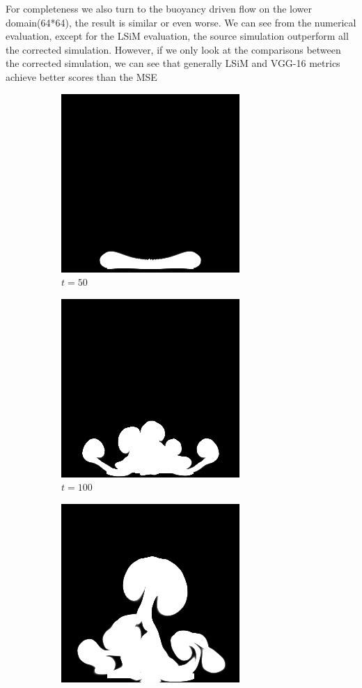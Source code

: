 \documentclass[a4paper,12pt,twoside]{report}
\begin{document}
For completeness we also turn to the buoyancy driven flow on the lower domain(64*64), the result is similar or even worse. We can see from the numerical evaluation, except for the LSiM evaluation, the source simulation outperform all the corrected simulation. However, if we only look at the comparisons between the corrected simulation, we can see that generally LSiM and VGG-16 metrics achieve better scores than the MSE
\begin{figure}
\centering
\begin{subfigure}{0.18\textwidth}
  \centering
  \includegraphics[scale=0.28]{buoyancy_test/dens_000050_ref.png}
  \caption{$t=50$}
\end{subfigure}
\begin{subfigure}{0.18\textwidth}
  \centering
  \includegraphics[scale=0.28]{buoyancy_test/dens_000100_ref.png}
  \caption{$t=100$}
\end{subfigure}
\begin{subfigure}{0.18\textwidth}
  \centering
  \includegraphics[scale=0.28]{buoyancy_test/dens_000150_ref.png}

\end{subfigure}
\end{figure}
\end{document}
